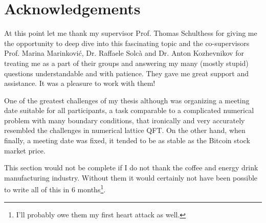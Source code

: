\documentclass{article}
\theoremstyle{plain} %
\theoremstyle{convention} %
\theoremstyle{remark} %
\numberwithin{equation}{section}
\begin{document}
\section{Acknowledgements}

At this point let me thank my supervisor Prof. Thomas Schulthess for giving me the opportunity to deep dive into this fascinating topic and the co-supervisors Prof. Marina Marinković, Dr. Raffaele Solcà and Dr. Anton Kozhevnikov for treating me as a part of their groups and answering my many (mostly stupid) questions understandable and with patience. They gave me great support and assistance. It was a pleasure to work with them!

One of the greatest challenges of my thesis although was organizing a meeting date suitable for all participants, a task comparable to a complicated numerical problem with many boundary conditions, that ironically and very accurately resembled the challenges in numerical lattice QFT. On the other hand, when finally, a meeting date was fixed, it tended to be as stable as the Bitcoin stock market price.

This section would not be complete if I do not thank the coffee and energy drink manufacturing industry. Without them it would certainly not have been possible to write all of this in \num{6} months\footnote{I'll probably owe them my first heart attack as well.}.


\newpage




\newpage
\end{document}

